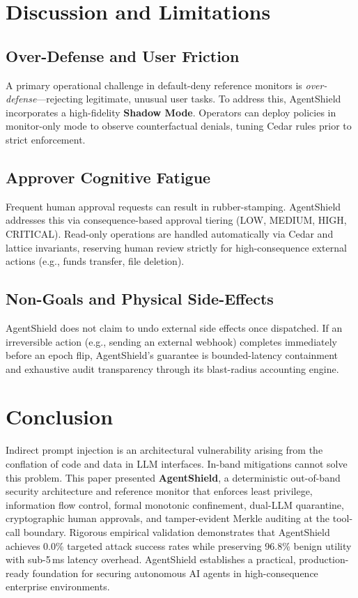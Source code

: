 \documentclass[conference]{IEEEtran}
\begin{document}
\section{Discussion and Limitations}
\label{sec:discussion}

\subsection{Over-Defense and User Friction}
A primary operational challenge in default-deny reference monitors is \textit{over-defense}---rejecting legitimate, unusual user tasks. To address this, AgentShield incorporates a high-fidelity \textbf{Shadow Mode}. Operators can deploy policies in monitor-only mode to observe counterfactual denials, tuning Cedar rules prior to strict enforcement.

\subsection{Approver Cognitive Fatigue}
Frequent human approval requests can result in rubber-stamping. AgentShield addresses this via consequence-based approval tiering (LOW, MEDIUM, HIGH, CRITICAL). Read-only operations are handled automatically via Cedar and lattice invariants, reserving human review strictly for high-consequence external actions (e.g., funds transfer, file deletion).

\subsection{Non-Goals and Physical Side-Effects}
AgentShield does not claim to undo external side effects once dispatched. If an irreversible action (e.g., sending an external webhook) completes immediately before an epoch flip, AgentShield's guarantee is bounded-latency containment and exhaustive audit transparency through its blast-radius accounting engine.

\section{Conclusion}
\label{sec:conclusion}
Indirect prompt injection is an architectural vulnerability arising from the conflation of code and data in LLM interfaces. In-band mitigations cannot solve this problem. This paper presented \textbf{AgentShield}, a deterministic out-of-band security architecture and reference monitor that enforces least privilege, information flow control, formal monotonic confinement, dual-LLM quarantine, cryptographic human approvals, and tamper-evident Merkle auditing at the tool-call boundary. Rigorous empirical validation demonstrates that AgentShield achieves 0.0\% targeted attack success rates while preserving 96.8\% benign utility with sub-5\,ms latency overhead. AgentShield establishes a practical, production-ready foundation for securing autonomous AI agents in high-consequence enterprise environments.
\end{document}
